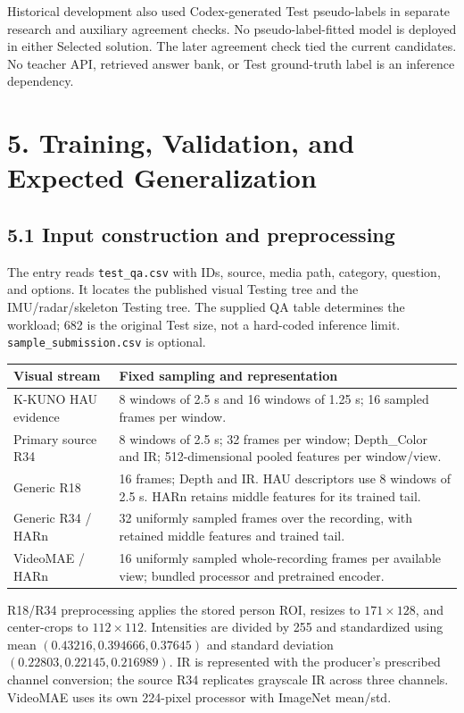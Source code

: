 \documentclass[12pt,a4paper]{article}
\newcommand{\file}[1]{\nolinkurl{#1}}
\newcommand{\pageheading}[1]{\vspace*{-5pt}\section*{#1}}
\begin{document}
Historical development also used Codex-generated Test pseudo-labels in separate research and auxiliary agreement checks. No pseudo-label-fitted model is deployed in either Selected solution. The later agreement check tied the current candidates. No teacher API, retrieved answer bank, or Test ground-truth label is an inference dependency.

\pageheading{5. Training, Validation, and Expected Generalization}
\subsection*{5.1 Input construction and preprocessing}
The entry reads \file{test_qa.csv} with IDs, source, media path, category, question, and options. It locates the published visual Testing tree and the IMU/radar/skeleton Testing tree. The supplied QA table determines the workload; 682 is the original Test size, not a hard-coded inference limit. \file{sample_submission.csv} is optional.

\begin{tabularx}{\linewidth}{@{}L{36mm}Y@{}}
\toprule
Visual stream & Fixed sampling and representation\\
\midrule
K-KUNO HAU evidence & 8 windows of 2.5 s and 16 windows of 1.25 s; 16 sampled frames per window. \\
Primary source R34 & 8 windows of 2.5 s; 32 frames per window; Depth\_Color and IR; 512-dimensional pooled features per window/view.\\
Generic R18 & 16 frames; Depth and IR. HAU descriptors use 8 windows of 2.5 s. HARn retains middle features for its trained tail.\\
Generic R34 / HARn & 32 uniformly sampled frames over the recording, with retained middle features and trained tail.\\
VideoMAE / HARn & 16 uniformly sampled whole-recording frames per available view; bundled processor and pretrained encoder.\\
\bottomrule
\end{tabularx}

R18/R34 preprocessing applies the stored person ROI, resizes to $171\times128$, and center-crops to $112\times112$. Intensities are divided by 255 and standardized using mean $(0.43216,0.394666,0.37645)$ and standard deviation $(0.22803,0.22145,0.216989)$. IR is represented with the producer's prescribed channel conversion; the source R34 replicates grayscale IR across three channels. VideoMAE uses its own 224-pixel processor with ImageNet mean/std.
\end{document}
